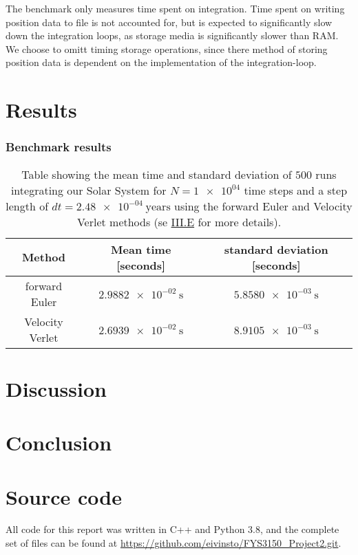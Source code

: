 \documentclass[reprint,english,notitlepage]{revtex4-1}  %
\begin{document}
The benchmark only measures time spent on integration. Time spent on writing position data to file is not accounted for, but is expected to significantly slow down the integration loops, as storage media is significantly slower than RAM. We choose to omitt timing storage operations, since there method of storing position data is dependent on the implementation of the integration-loop.

\section{Results} \label{sec:IV}

\subsubsection{Benchmark results} \label{sec:IV:a}
\begin{table}[H] \label{table:IV:a}
\caption{Table showing the mean time and standard deviation of \(500\) runs integrating our Solar System for \(N = \num{1e+04}\) time steps and a step length of \(dt = \SI{2.48e-04}{\text{years}}\) using the forward Euler and Velocity Verlet methods (se \hyperref[sec:III:e]{III.E} for more details).}
\begin{tabular}{|c|c|c|}
\hline
Method & Mean time [seconds] & standard deviation [seconds] \\
\hline 
forward Euler & \(\SI{2.9882e-02}{\second}\) & \(\SI{5.8580e-03}{\second}\) \\
Velocity Verlet &  \(\SI{2.6939e-02}{\second}\) & \(\SI{8.9105e-03}{\second}\)\\
\hline
\end{tabular}
\end{table} 

\section{Discussion} \label{sec:V}

\section{Conclusion} \label{sec:VI}
\onecolumngrid
{}
\newpage
\twocolumngrid

\appendix
\section{Source code} \label{A}
All code for this report was written in C++ and Python 3.8, and the complete set of files can be found at
\url{https://github.com/eivinsto/FYS3150_Project2.git}.
\end{document}
